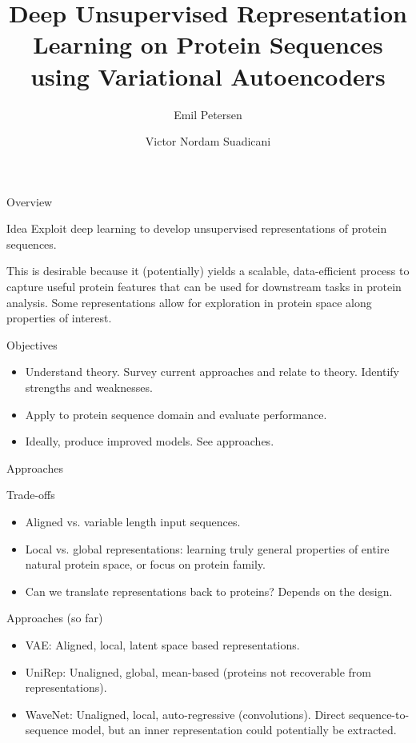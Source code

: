 \documentclass[dvipsnames]{beamer}
\title{\large Deep Unsupervised Representation Learning on Protein
Sequences using Variational Autoencoders}
\author{{Emil Petersen} \and {Victor Nordam Suadicani}}
\begin{document}
\frame{\titlepage}

\begin{frame}{Overview}

\begin{block}{Idea}
Exploit deep learning to develop unsupervised representations of protein sequences.

This is desirable because it (potentially) yields a scalable, data-efficient process to capture useful protein features that can be used for downstream tasks in protein analysis. Some representations allow for exploration in protein space along properties of interest.
\end{block}

\begin{block}{Objectives}
\begin{itemize}
    \item Understand theory. Survey current approaches and relate to theory. Identify strengths and weaknesses.
    \item Apply to protein sequence domain and evaluate performance.
    \item Ideally, produce improved models. See approaches.
\end{itemize}
\end{block}
\end{frame}

\begin{frame}{Approaches}
    \begin{block}{Trade-offs}
    \begin{itemize}
        \item Aligned vs. variable length input sequences.
        \item Local vs. global representations: learning truly general properties of entire natural protein space, or focus on protein family.
        \item Can we translate representations back to proteins? Depends on the design.
    \end{itemize}
    \end{block}
    
    \begin{block}{Approaches (so far)}
    \begin{itemize}
        \item VAE: Aligned, local, latent space based representations.
        \item UniRep: Unaligned, global, mean-based (proteins not recoverable from representations).
        \item WaveNet: Unaligned, local, auto-regressive (convolutions). Direct sequence-to-sequence model, but an inner representation could potentially be extracted.
    \end{itemize}
    \end{block}
\end{frame}
\end{document}
